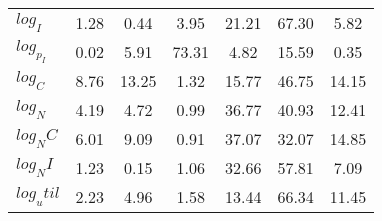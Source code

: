 \begin{center}
\begin{longtable}{lcccccc}
$log_I     $	 & 	        1.28	 & 	        0.44	 & 	        3.95	 & 	       21.21	 & 	       67.30	 & 	        5.82 \\ 
$log_p_I   $	 & 	        0.02	 & 	        5.91	 & 	       73.31	 & 	        4.82	 & 	       15.59	 & 	        0.35 \\ 
$log_C     $	 & 	        8.76	 & 	       13.25	 & 	        1.32	 & 	       15.77	 & 	       46.75	 & 	       14.15 \\ 
$log_N     $	 & 	        4.19	 & 	        4.72	 & 	        0.99	 & 	       36.77	 & 	       40.93	 & 	       12.41 \\ 
$log_NC    $	 & 	        6.01	 & 	        9.09	 & 	        0.91	 & 	       37.07	 & 	       32.07	 & 	       14.85 \\ 
$log_NI    $	 & 	        1.23	 & 	        0.15	 & 	        1.06	 & 	       32.66	 & 	       57.81	 & 	        7.09 \\ 
$log_util  $	 & 	        2.23	 & 	        4.96	 & 	        1.58	 & 	       13.44	 & 	       66.34	 & 	       11.45 \\ 
\end{longtable}
 \end{center}

